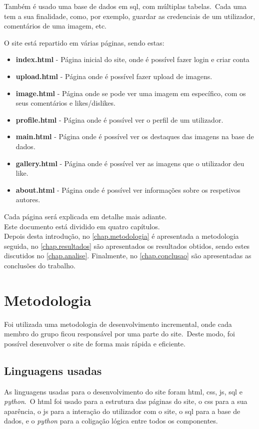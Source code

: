 \documentclass{report}
\begin{document}
Também é usado uma base de dados em \ac{sql}, com múltiplas tabelas.\ Cada uma tem a sua finalidade, como, por exemplo, guardar as credenciais de um utilizador, comentários de uma imagem, etc.

O site está repartido em várias páginas, sendo estas:
\begin{itemize}
    \item \textbf{index.html} - Página inicial do site, onde é possível fazer login e criar conta
    \item \textbf{upload.html} - Página onde é possível fazer upload de imagens.
    \item \textbf{image.html} - Página onde se pode ver uma imagem em específico, com os seus comentários e likes/dislikes.
    \item \textbf{profile.html} - Página onde é possível ver o perfil de um utilizador.
    \item \textbf{main.html} - Página onde é possível ver os destaques das imagens na base de dados.
    \item \textbf{gallery.html} - Página onde é possível ver as imagens que o utilizador deu like.
    \item \textbf{about.html} - Página onde é possível ver informações sobre os respetivos autores.
\end{itemize}

Cada página será explicada em detalhe mais adiante.\\

Este documento está dividido em quatro capítulos.\\

Depois desta introdução,
no \autoref{chap.metodologia} é apresentada a metodologia seguida,
no \autoref{chap.resultados} são apresentados os resultados obtidos,
sendo estes discutidos no \autoref{chap.analise}.
Finalmente, no \autoref{chap.conclusao} são apresentadas
as conclusões do trabalho.

\chapter{Metodologia}
\label{chap.metodologia}
    Foi utilizada uma metodologia de desenvolvimento incremental, onde cada membro do grupo ficou responsável por uma parte do site.\ Deste modo, foi possível desenvolver o site de forma mais rápida e eficiente.\\

\section{Linguagens usadas}\label{sec:linguagens-usadas}
    As linguagens usadas para o desenvolvimento do site foram \ac{html}, \ac{css}, \ac{js}, \ac{sql} e \textit{python}.\ O \ac{html} foi usado para a estrutura das páginas do site, o \ac{css} para a sua aparência, o \ac{js} para a interação do utilizador com o site, o \ac{sql} para a base de dados, e o \textit{python} para a coligação lógica entre todos os componentes.\\
\end{document}
